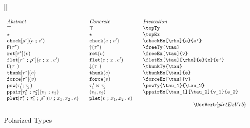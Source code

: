 \documentclass[11pt]{article}
\begin{document}
\begin{figure}

  ||
  \begin{small}
    \begin{displaymath}
      \begin{array}{l@{\qquad}l@{\qquad}l@{\qquad}l}
        \textit{Abstract} & \textit{Concrete} & \textit{Invocation} \\
        \topTy                                        & \topTy*                   & \verb|\topTy| \\
        \topEx                                        & \topEx*                   & \verb|\topEx| \\
        \chckEx[\negTy{\rho}]{e}{e'}                 & \chckEx*{e}{e'}          & \verb|\checkEx[\rho]{e}{e'}| \\
        \freeTy{\posTy{\tau}}                         & \freeTy*{\posTy{\tau}}    & \verb|\freeTy{\tau}|                         \\
        \freeEx[\posTy{\tau}]{v}                      & \freeEx*[\posTy{\tau}]{v} & \verb|\freeEx[\tau]{v}|                      \\
        \fletEx[\negTy{\tau}][\negTy{\rho}]{e}{x}{e'} & \fletEx*{e}{x}{e'}        & \verb|\fletEx[\tau][\rho]{e}{x}{e'}| \\
        \thunkTy{\negTy{\tau}}                        & \thunkTy*{\negTy{\tau}}   & \verb|\thunkTy{\tau}|                        \\
        \thunkEx[\negTy{\tau}]{e}                     & \thunkEx*{e}              & \verb|\thunkEx[\tau]{e}|                     \\
        \forceEx[\negTy{\tau}]{v}                     & \forceEx*{v}              & \verb|\forceEx[\tau]{v}| \\
        \powTy{\posTy{\tau_1}}{\negTy{\tau_2}}            & \powTy*{\posTy{\tau_1}}{\negTy{\tau_2}}             & \verb|\powTy{\tau_1}{\tau_2}| \\
        \ppairEx[\posTy{\tau_1}][\negTy{\tau_2}]{v_1}{e_2}                                & \ppairEx*{v_1}{e_2}           & \verb|\ppairEx[\tau_1][\tau_2]{v_1}{e_2}| \\
        \pletEx{v}{x_1}{x_2}{e}                       & \pletEx*{v}{x_1}{x_2}{e}  & \\
          \multicolumn{3}{r}{\UseVerb{pletExVrb}}
      \end{array}
    \end{displaymath}
  \end{small}

  \caption{Polarized Types}
  \label{fig:pol}
\end{figure}
\end{document}
